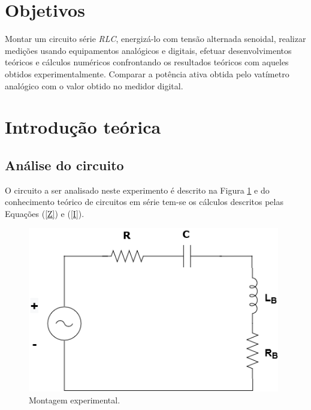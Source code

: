 \documentclass[a4paper,12pt,oneside,openany,table,xcdraw]{article}
\begin{document}
\newcommand{\thedepartment}{Faculdade de Engenharia Elétrica}
\newcommand{\thecourse}{FEELT}
\newcommand{\thetitle}{TENSÕES, CORRENTE E POTÊNCIAS EM CIRCUITO SÉRIE, FATOR DE POTÊNCIA E CORRENTE ALTERNADA SENOIDAL - USO DE MEDIDORES ANALÓGICOS E DIGITAIS - VATÍMETRO ANALÓGICO}
\newcommand{\thetype}{Relatório da Disciplina de Circuitos Elétricos II}
\newcommand{\theproftitle}{Bacharel em Engenharia Elétrica}
\newcommand{\thestudent}{Lesly Viviane Montúfar Berrios\\
\centering11811ETE001}
\newcommand{\theadvisor}{Prof. Wellington Maycon Santos Bernardes}
\newcommand{\thecity}{Uberlândia}

\thispagestyle{empty}


\onehalfspacing
\tableofcontents %
\newpage

\section{Objetivos} %
Montar um circuito série \emph{RLC}, energizá-lo com tensão alternada senoidal, realizar medições usando
equipamentos analógicos e digitais, efetuar desenvolvimentos teóricos e cálculos numéricos confrontando os
resultados teóricos com aqueles obtidos experimentalmente. Comparar a potência ativa
obtida pelo vatímetro analógico com o valor obtido no medidor digital.

\section{Introdução teórica} %

\subsection{Análise do circuito}
O circuito a ser analisado neste experimento é descrito na Figura \ref{circuito} e do conhecimento teórico de circuitos em série tem-se os cálculos descritos pelas Equações (\ref{Z}) e (\ref{I}).

\begin{figure}[H]
\centering
\captionsetup{font=scriptsize}
\includegraphics[width=11cm]{circuito}
\caption{Montagem experimental.}
\label{circuito}
\end{figure}
\end{document}
